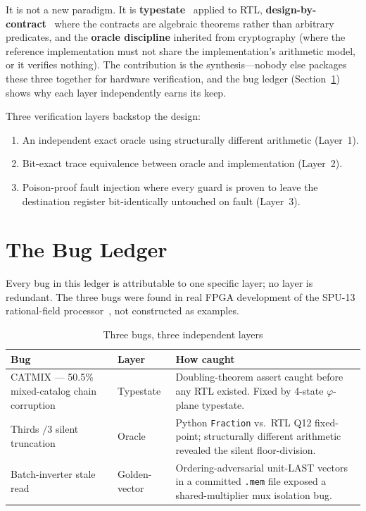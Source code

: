 \documentclass[conference]{IEEEtran}
\begin{document}
It is not a new paradigm.  It is \textbf{typestate}~\cite{strom86} applied to
RTL, \textbf{design-by-contract}~\cite{meyer92} where the contracts are
algebraic theorems rather than arbitrary predicates, and the \textbf{oracle
discipline} inherited from cryptography (where the reference implementation
must not share the implementation's arithmetic model, or it verifies nothing).
The contribution is the synthesis---nobody else packages these three together
for hardware verification, and the bug ledger (Section~\ref{sec:bugs}) shows
why each layer independently earns its keep.

Three verification layers backstop the design:
\begin{enumerate}
\item An independent exact oracle using structurally different arithmetic
  (Layer~1).
\item Bit-exact trace equivalence between oracle and implementation (Layer~2).
\item Poison-proof fault injection where every guard is proven to leave the
  destination register bit-identically untouched on fault (Layer~3).
\end{enumerate}

\section{The Bug Ledger}\label{sec:bugs}

Every bug in this ledger is attributable to one specific layer; no layer is
redundant.  The three bugs were found in real FPGA development of the SPU-13
rational-field processor~\cite{spu13}, not constructed as examples.

\begin{table}[h]
\centering
\caption{Three bugs, three independent layers}
\label{tab:bugs}
\begin{tabular}{p{2.2cm}p{1.4cm}p{2.8cm}}
\toprule
\textbf{Bug} & \textbf{Layer} & \textbf{How caught} \\
\midrule
CATMIX --- 50.5\% mixed-catalog chain corruption
& Typestate
& Doubling-theorem assert caught before any RTL existed.  Fixed by 4-state
  $\varphi$-plane typestate. \\
\midrule
Thirds $/3$ silent truncation
& Oracle
& Python \texttt{Fraction} vs.\ RTL Q12 fixed-point; structurally different
  arithmetic revealed the silent floor-division. \\
\midrule
Batch-inverter stale read
& Golden-vector
& Ordering-adversarial unit-LAST vectors in a committed \texttt{.mem} file
  exposed a shared-multiplier mux isolation bug. \\
\bottomrule
\end{tabular}
\end{table}
\end{document}

